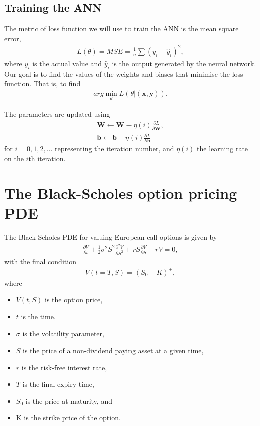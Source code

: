 \documentclass[12pt,a4paper]{article}
\begin{document}
\subsection{Training the ANN}
The metric of loss function we will use to train the ANN is the mean square error,
\begin{align}
    L(\theta) = MSE = \frac{1}{n}\sum(y_i-\hat{y}_i)^2,
\end{align}
where $y_i$ is the actual value and $\hat{y}_i$ is the output generated by the neural network.
Our goal is to find the values of the weights and biases that minimise the loss function. That is, to find
\begin{align}
    arg\min_\theta L(\theta|(\mathbf{x}, \mathbf{y})).
\end{align}

The parameters are updated using
\begin{align}
    \mathbf{W} \leftarrow \mathbf{W} - \eta(i)\frac{\partial L}{\partial \mathbf{W}}, \nonumber \\
    \mathbf{b} \leftarrow \mathbf{b} - \eta(i)\frac{\partial L}{\partial \mathbf{b}}
\end{align}
for $i=0, 1, 2,...$ representing the iteration number, and $\eta(i)$ the learning rate on the $i$th iteration.

\section{The Black-Scholes option pricing PDE}
The Black-Scholes PDE for valuing European call options is given by
\begin{align}
    \frac{\partial V}{\partial{t}} + \frac{1}{2}\sigma^2S^2\frac{\partial^2V}{\partial S^2}+rS\frac{\partial V}{\partial S} -rV = 0,
\end{align}
with the final condition
    \begin{align}
    V(t=T,S) = (S_0-K)^+,
\end{align}
where
\begin{itemize}
    \item $V(t,S)$ is the option price,
    \item $t$ is the time,
    \item $\sigma$ is the volatility parameter,
    \item $S$ is the price of a non-dividend paying asset at a given time,
    \item $r$ is the risk-free interest rate,
    \item $T$ is the final expiry time,
    \item $S_0$ is the price at maturity, and
    \item K is the strike price of the option.
\end{itemize}
\end{document}
